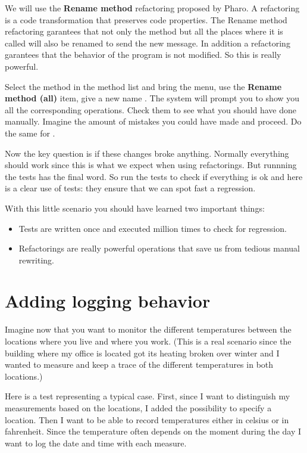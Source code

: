 \documentclass[10pt,twoside,english]{_support/latex/sbabook/sbabook}
\begin{document}
We will use the \textbf{Rename method} refactoring proposed by Pharo. A refactoring is a code transformation that preserves code properties. The Rename method refactoring garantees that not only the method but all the places where it is called will also be renamed to send the new message. In addition a refactoring garantees that the behavior of the program is not modified. 
So this is really powerful. 

Select the method  in the method list and bring the menu, use the \textbf{Rename method (all)} item, give a new name . The system will prompt you to show you all the corresponding operations. Check them to see what you should have done manually. Imagine the amount of mistakes you could have made and proceed. Do the same for .

Now the key question is if these changes broke anything. Normally everything should work 
since this is what we expect when using refactorings. But runnning the tests has the final word. So run the tests to check if everything is ok and here is a clear use of tests: they ensure that we can spot fast a regression. 

With this little scenario you should have learned two important things:

\begin{itemize}
\item Tests are written once and executed million times to check for regression. 
\item Refactorings are really powerful operations that save us from tedious manual rewriting.
\end{itemize}
\section{Adding logging behavior}
Imagine now that you want to monitor the different temperatures between the locations where you live and where you work. (This is a real scenario since the building where my office is located got its heating broken over winter and I wanted to measure and keep a trace of the different temperatures in both locations.)

Here is a test representing a typical case.
First, since I want to distinguish my measurements based on the locations, I added the possibility to specify a location. Then I want to be able to record temperatures either in celsius or in fahrenheit. Since the temperature often depends on the moment during the day I want to log the date and time with each measure. 
\end{document}
